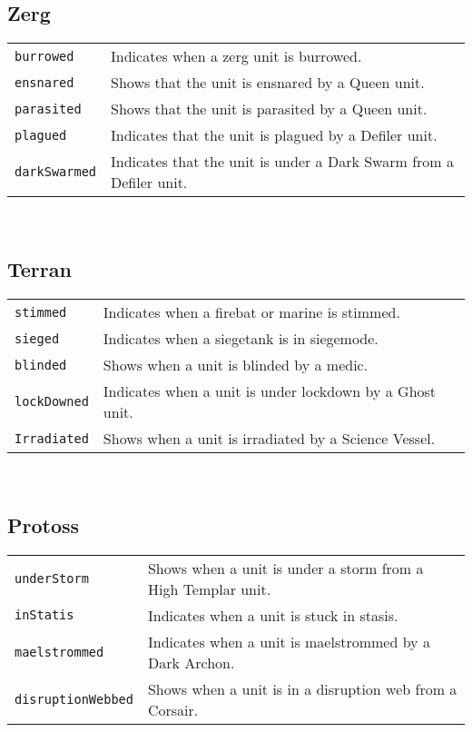 \subsection{Zerg}
\begin{tabularx}{\textwidth}{lX}
\verb|burrowed| & Indicates when a zerg unit is burrowed. \\
\verb|ensnared| & Shows that the unit is ensnared by a Queen unit. \\
\verb|parasited| & Shows that the unit is parasited by a Queen unit. \\
\verb|plagued| & Indicates that the unit is plagued by a Defiler unit. \\
\verb|darkSwarmed| & Indicates that the unit is under a Dark Swarm from a Defiler unit. \\
\end{tabularx} \\

\subsection{Terran}
\begin{tabularx}{\textwidth}{lX}
 \verb|stimmed| & Indicates when a firebat or marine is stimmed.\\
 \verb|sieged| & Indicates when a siegetank is in siegemode.\\
 \verb|blinded| & Shows when a unit is blinded by a medic. \\
 \verb|lockDowned| & Indicates when a unit is under lockdown by a Ghost unit. \\
 \verb|Irradiated| & Shows when a unit is irradiated by a Science Vessel. \\
\end{tabularx} \\

\subsection{Protoss}
\begin{tabularx}{\textwidth}{lX}
\verb|underStorm| & Shows when a unit is under a storm from a High Templar unit. \\
\verb|inStatis| & Indicates when a unit is stuck in stasis. \\
\verb|maelstrommed| & Indicates when a unit is maelstrommed by a Dark Archon. \\
\verb|disruptionWebbed| & Shows when a unit is in a disruption web from a Corsair. \\
\end{tabularx} \\

